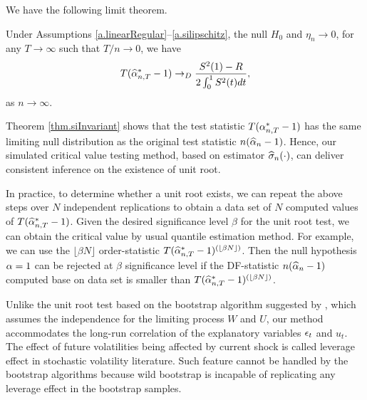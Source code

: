 We have the following limit theorem.
\begin{thm} 
Under  Assumptions \ref{a.linearRegular}--\ref{a.silipschitz}, the null $H_0$ and $\eta_n\to 0$, for any $T\to\infty$ such that $T/ n \to 0$, we have
\begin{equation} \la{thm.siInvariant.eqn1}
T( \widehat{\al}^*_{n,T} - 1) \rightarrow_D \frac{S^2(1) - R}
{ 2 \int_{0}^{1} S^2(t) dt },
\end{equation}
as $n \to \infty$.
\end{thm}


\begin{rem}
Theorem \ref{thm.siInvariant} shows that the test statistic $T (\alpha_{n,T}^* - 1)$ has the same limiting null distribution as the original test statistic $n (\widehat{\alpha}_n - 1)$. Hence, our simulated critical value testing method, based on estimator $\widehat{\sigma}_n(\cdot)$, can deliver consistent inference on the existence of unit root.
\end{rem}

\begin{rem} 
In practice, to determine whether a unit root exists, we can repeat the above steps over $N$ independent replications to obtain a data set of $N$ computed values of $T( \widehat{\alpha}^*_{n,T} - 1)$. Given the desired significance level $\beta$ for the unit root test, we can obtain the critical value by usual quantile estimation method. For example, we can use the $\lfloor \beta N \rfloor $ order-statistic $T( \widehat{\alpha}^*_{n,T} - 1)^{(\lfloor \beta N\rfloor)}$. Then the null hypothesis $\alpha=1$ can be rejected at $\beta$ significance level if the DF-statistic $n (\widehat{\alpha}_n - 1)$ computed base on data set is smaller than $T( \widehat{\alpha}^*_{n,T} - 1)^{(\lfloor \beta N\rfloor)}$.
\end{rem}

\begin{rem}
Unlike the unit root test based on the bootstrap algorithm suggested by \cite{cavalieretaylor2009}, which assumes the independence for the limiting process $W$ and $ U$, our method accommodates the long-run correlation of the explanatory variables $\epsilon_t$ and $u_t$. The effect of future volatilities being affected by current shock is called leverage effect in stochastic volatility literature. Such feature cannot be handled by the bootstrap algorithms because wild bootstrap is incapable of replicating any leverage effect in the bootstrap samples.
\end{rem}

